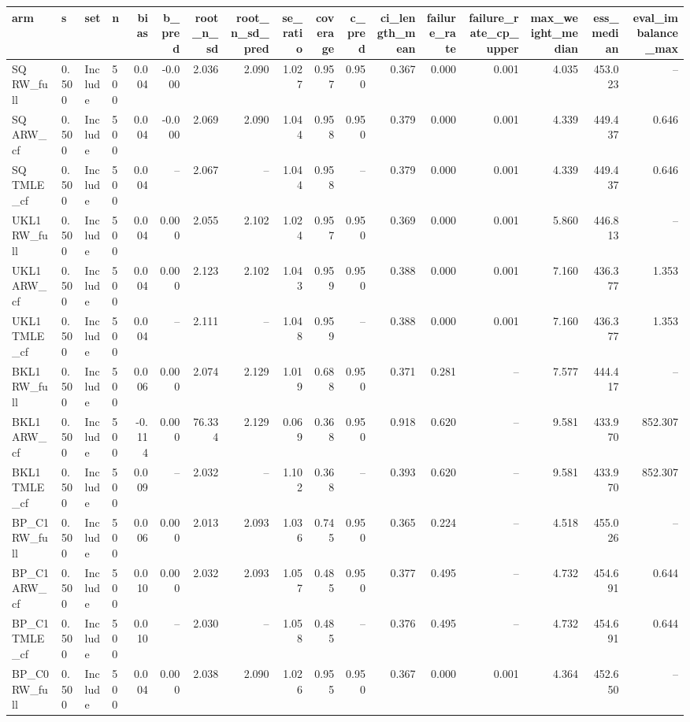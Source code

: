 \begin{tabular}{llllrrrrrrrrrrrrr}
\hline
arm & s & set & n & bias & b\_pred & root\_n\_sd & root\_n\_sd\_pred & se\_ratio & coverage & c\_pred & ci\_length\_mean & failure\_rate & failure\_rate\_cp\_upper & max\_weight\_median & ess\_median & eval\_imbalance\_max \\
\hline
SQ RW\_full & 0.500 & Include & 500 & 0.004 & -0.000 & 2.036 & 2.090 & 1.027 & 0.957 & 0.950 & 0.367 & 0.000 & 0.001 & 4.035 & 453.023 & -- \\
SQ ARW\_cf & 0.500 & Include & 500 & 0.004 & -0.000 & 2.069 & 2.090 & 1.044 & 0.958 & 0.950 & 0.379 & 0.000 & 0.001 & 4.339 & 449.437 & 0.646 \\
SQ TMLE\_cf & 0.500 & Include & 500 & 0.004 & -- & 2.067 & -- & 1.044 & 0.958 & -- & 0.379 & 0.000 & 0.001 & 4.339 & 449.437 & 0.646 \\
UKL1 RW\_full & 0.500 & Include & 500 & 0.004 & 0.000 & 2.055 & 2.102 & 1.024 & 0.957 & 0.950 & 0.369 & 0.000 & 0.001 & 5.860 & 446.813 & -- \\
UKL1 ARW\_cf & 0.500 & Include & 500 & 0.004 & 0.000 & 2.123 & 2.102 & 1.043 & 0.959 & 0.950 & 0.388 & 0.000 & 0.001 & 7.160 & 436.377 & 1.353 \\
UKL1 TMLE\_cf & 0.500 & Include & 500 & 0.004 & -- & 2.111 & -- & 1.048 & 0.959 & -- & 0.388 & 0.000 & 0.001 & 7.160 & 436.377 & 1.353 \\
BKL1 RW\_full & 0.500 & Include & 500 & 0.006 & 0.000 & 2.074 & 2.129 & 1.019 & 0.688 & 0.950 & 0.371 & 0.281 & -- & 7.577 & 444.417 & -- \\
BKL1 ARW\_cf & 0.500 & Include & 500 & -0.114 & 0.000 & 76.334 & 2.129 & 0.069 & 0.368 & 0.950 & 0.918 & 0.620 & -- & 9.581 & 433.970 & 852.307 \\
BKL1 TMLE\_cf & 0.500 & Include & 500 & 0.009 & -- & 2.032 & -- & 1.102 & 0.368 & -- & 0.393 & 0.620 & -- & 9.581 & 433.970 & 852.307 \\
BP\_C1 RW\_full & 0.500 & Include & 500 & 0.006 & 0.000 & 2.013 & 2.093 & 1.036 & 0.745 & 0.950 & 0.365 & 0.224 & -- & 4.518 & 455.026 & -- \\
BP\_C1 ARW\_cf & 0.500 & Include & 500 & 0.010 & 0.000 & 2.032 & 2.093 & 1.057 & 0.485 & 0.950 & 0.377 & 0.495 & -- & 4.732 & 454.691 & 0.644 \\
BP\_C1 TMLE\_cf & 0.500 & Include & 500 & 0.010 & -- & 2.030 & -- & 1.058 & 0.485 & -- & 0.376 & 0.495 & -- & 4.732 & 454.691 & 0.644 \\
BP\_C0 RW\_full & 0.500 & Include & 500 & 0.004 & 0.000 & 2.038 & 2.090 & 1.026 & 0.955 & 0.950 & 0.367 & 0.000 & 0.001 & 4.364 & 452.650 & -- \\

\end{tabular}
